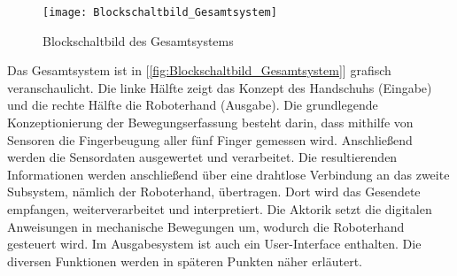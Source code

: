 \documentclass[titlepage,12pt,twoside]{article}
\begin{document}
	\begin{figure}[H]
		\begin{center}
			\scalebox{1.2}
			{\texttt{[image: Blockschaltbild\_Gesamtsystem]}}
			\caption{Blockschaltbild des Gesamtsystems}
			\label{fig:Blockschaltbild_Gesamtsystem}		
		\end{center}
	\end{figure}

Das Gesamtsystem ist in [\textcolor{blue}{\autoref{fig:Blockschaltbild_Gesamtsystem}}] grafisch veranschaulicht. Die linke Hälfte zeigt das Konzept des 
Handschuhs (Eingabe) und die rechte Hälfte die Roboterhand (Ausgabe). Die grundlegende Konzeptionierung der Bewegungserfassung 
besteht darin, dass mithilfe von Sensoren die Fingerbeugung aller fünf Finger gemessen wird. Anschließend werden die Sensordaten
ausgewertet und verarbeitet. Die resultierenden Informationen werden anschließend über eine drahtlose Verbindung an das zweite 
Subsystem, nämlich der Roboterhand, übertragen. Dort wird das Gesendete empfangen, weiterverarbeitet und interpretiert. Die Aktorik
setzt die digitalen Anweisungen in mechanische Bewegungen um, wodurch die Roboterhand gesteuert wird. Im Ausgabesystem ist auch 
ein User-Interface enthalten. Die diversen Funktionen werden in späteren Punkten näher erläutert.
\end{document}
